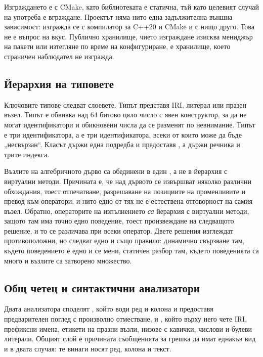 Изграждането е с CMake, като библиотеката е статична, тъй като целевият случай на
употреба е вграждане. Проектът няма нито една задължителна външна зависимост: изгражда
се с компилатор за C++20 и CMake и с нищо друго. Това не е въпрос на вкус. Публично
хранилище, чието изграждане изисква мениджър на пакети или изтегляне по време на
конфигуриране, е хранилище, което страничен наблюдател не изгражда.

\subsection{Йерархия на типовете}

Ключовите типове следват слоевете. Типът  представя IRI, литерал или празен
възел. Типът  е обвивка над 64 битово цяло число с явен конструктор, за да
не могат идентификатори и обикновени числа да се разменят по невнимание. Типът
 е три идентификатора, а  е три идентификатора, всеки
от които може да бъде „несвързан“. Класът  държи една подредба и
предоставя , а  държи речника и трите индекса.

Възлите на алгебричното дърво са обединени в един , а не в йерархия
с виртуални методи. Причината е, че над дървото се извършват няколко различни
обхождания, тоест отпечатване, разрешаване на позициите на променливите и превод към
оператори, и нито едно от тях не е естествена отговорност на самия възел. Обратно,
операторите на изпълнението \emph{са} йерархия с виртуални методи, защото там има
точно едно поведение, тоест произвеждане на следващото решение, и то се различава при
всеки оператор. Двете решения изглеждат противоположни, но следват едно и също правило:
динамично свързване там, където поведението е едно и се мени, статичен разбор там,
където поведенията са много и възлите са затворено множество.

\subsection{Общ четец и синтактични анализатори}

Двата анализатора споделят , който води ред и колона и предоставя
предварителен поглед с произволно отместване, и , който върху него
чете IRI, префиксни имена, етикети на празни възли, низове с кавички, числови и булеви
литерали. Общият слой е причината съобщенията за грешка да имат еднакъв вид и в двата
случая: те винаги носят ред, колона и текст.

